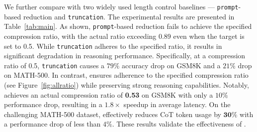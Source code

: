 We further compare \method with two widely used length control baselines --- \texttt{prompt}-based reduction and \texttt{truncation}. The experimental results are presented in Table~\ref{tab:main}. As shown, \texttt{prompt}-based reduction fails to achieve the specified compression ratio, with the actual ratio exceeding 0.89 even when the target is set to 0.5. While \texttt{truncation} adheres to the specified ratio, it results in significant degradation in reasoning performance. Specifically, at a compression ratio of 0.5, \texttt{truncation} causes a $79\%$ accuracy drop on GSM8K and a $21\%$ drop on MATH-500. In contrast, \method ensures adherence to the specified compression ratio (see Figure~\ref{fig:allratio}) while preserving strong reasoning capabilities. Notably, \method achieves an actual compression ratio of \textbf{0.53} on GSM8K with only a $10\%$ performance drop, resulting in a $\bm{1.8}\times$ speedup in average latency. On the challenging MATH-500 dataset, \method effectively reduces CoT token usage by $\bm{30}\%$ with a performance drop of less than $4\%$. These results validate the effectiveness of \method.